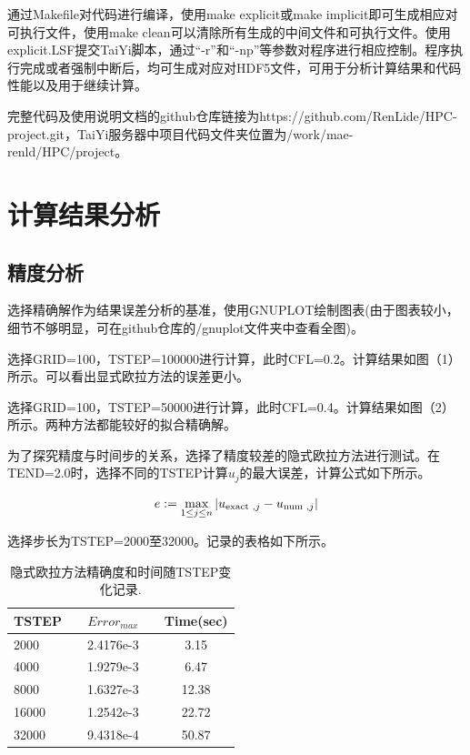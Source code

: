 \documentclass[final]{cvpr}
\begin{document}
通过Makefile对代码进行编译，使用make explicit或make implicit即可生成相应对可执行文件，使用make clean可以清除所有生成的中间文件和可执行文件。使用explicit.LSF提交TaiYi脚本，通过“-r”和“-np”等参数对程序进行相应控制。程序执行完成或者强制中断后，均可生成对应对HDF5文件，可用于分析计算结果和代码性能以及用于继续计算。

完整代码及使用说明文档的github仓库链接为https://github.com/RenLide/HPC-project.git，TaiYi服务器中项目代码文件夹位置为/work/mae-renld/HPC/project。




\section{计算结果分析}\label{sec:HC}
\subsection{精度分析}

选择精确解作为结果误差分析的基准，使用GNUPLOT绘制图表(由于图表较小，细节不够明显，可在github仓库的/gnuplot文件夹中查看全图)。

选择GRID=100，TSTEP=100000进行计算，此时CFL=0.2。计算结果如图（1）所示。可以看出显式欧拉方法的误差更小。


选择GRID=100，TSTEP=50000进行计算，此时CFL=0.4。计算结果如图（2）所示。两种方法都能较好的拟合精确解。


为了探究精度与时间步的关系，选择了精度较差的隐式欧拉方法进行测试。在TEND=2.0时，选择不同的TSTEP计算$u_{j}$的最大误差，计算公式如下所示。
\begin{center}
	\begin{scriptsize}
		\begin{equation}
			\setlength{\abovedisplayskip}{-5pt}
			e:=\max _{1 \leq j \leq n}\left|u_{\text {exact }, j}-u_{\text {num }, j}\right|
		\end{equation}
	\end{scriptsize}
\end{center}

选择步长为TSTEP=2000至32000。记录的表格如下所示。

\begin{table}[h]
	\centering
	\caption{隐式欧拉方法精确度和时间随TSTEP变化记录.}
	\label{tab:univ-compa}
	\begin{tabular}{lcccc}
		\toprule
		\textbf{TSTEP} && \textbf{$Error_{max}$} && \textbf{Time(sec)}\\ \midrule
		  2000 && 2.4176e-3 && 3.15  \\ 
		  4000 && 1.9279e-3 && 6.47  \\ 
		  8000  &&1.6327e-3 &&12.38 \\
		16000  &&1.2542e-3 &&  22.72\\
		32000  &&9.4318e-4 &&  50.87\\
		\bottomrule
	\end{tabular}
\end{table}
\end{document}
